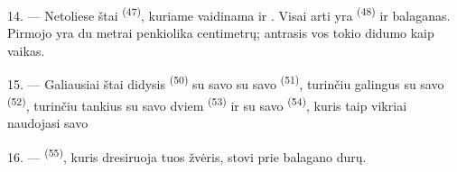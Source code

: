 14. --- Netoliese štai  \textsuperscript{(47)}, kuriame
vaidinama  ir . Visai arti yra 
\textsuperscript{(48)} ir  balaganas. Pirmojo  yra du
metrai penkiolika centimetrų; antrasis vos tokio didumo kaip vaikas.

15. --- Galiausiai štai didysis  \textsuperscript{(50)} su savo
 su savo  \textsuperscript{(51)}, turinčiu
galingus  su savo  \textsuperscript{(52)}, turinčiu
tankius  su savo dviem  \textsuperscript{(53)} ir
su savo  \textsuperscript{(54)}, kuris taip vikriai naudojasi savo

16. ---  \textsuperscript{(55)}, kuris dresiruoja tuos žvėris,
stovi prie balagano durų.

\VUsaut{6.0mm}
\VUfilet{22mm}
